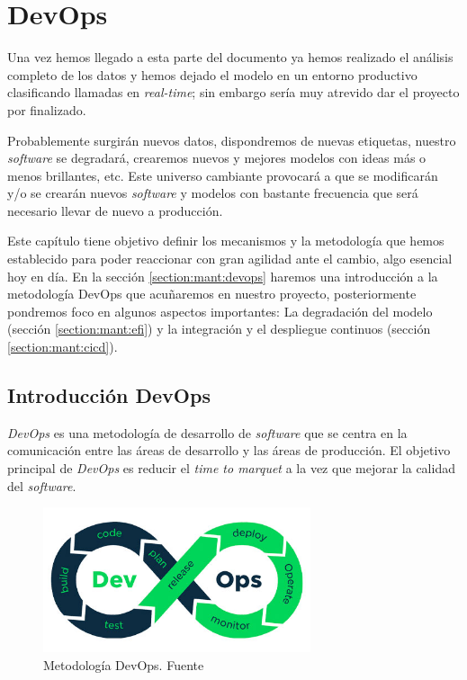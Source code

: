 \chapter{DevOps}
\label{chapter:mant}

Una vez hemos llegado a esta parte del documento ya hemos realizado el análisis completo de los datos y hemos dejado el modelo en un entorno productivo clasificando llamadas en \textit{real-time}; sin embargo sería muy atrevido dar el proyecto por finalizado.

Probablemente surgirán nuevos datos, dispondremos de nuevas etiquetas, nuestro \textit{software} se degradará, crearemos nuevos y mejores modelos con ideas más o menos brillantes, etc. Este universo cambiante provocará a que se modificarán y/o se crearán nuevos \textit{software} y modelos con bastante frecuencia que será necesario llevar de nuevo a producción.  

Este capítulo tiene objetivo definir los mecanismos y la metodología que hemos establecido para poder reaccionar con gran agilidad ante el cambio, algo esencial hoy en día. En la sección \ref{section:mant:devops} haremos una introducción a la metodología DevOps que acuñaremos en nuestro proyecto, posteriormente pondremos foco en algunos aspectos importantes: La degradación del modelo (sección \ref{section:mant:efi}) y la integración y el despliegue continuos (sección \ref{section:mant:cicd}).


\section{Introducción DevOps}

\textit{DevOps} es una metodología de desarrollo de \textit{software} que se centra en la comunicación entre las áreas de desarrollo y las áreas de producción. El objetivo principal de \textit{DevOps} es reducir el \textit{time to marquet} a la vez que mejorar la calidad del \textit{software}.

\label{section:mant:devops}


\begin{figure}[!ht]
	\centering
	\includegraphics[width=0.7\textwidth]{images/mant/devops}
	\caption{Metodología DevOps. Fuente \cite{devops}}
	\label{fig:devops}
\end{figure}




